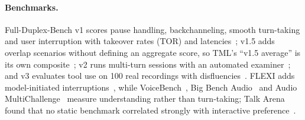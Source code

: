 \paragraph{Benchmarks.}
Full-Duplex-Bench v1 scores pause handling, backchanneling, smooth turn-taking and user interruption with takeover rates
(TOR) and latencies~\citep{lin2025fdbv1}; v1.5 adds overlap scenarios without defining an aggregate score, so TML's
``v1.5 average'' is its own composite~\citep{lin2025fdbv15}; v2 runs multi-turn sessions with an automated
examiner~\citep{lin2026fdbv2}; and v3 evaluates tool use on 100 real recordings with disfluencies~\citep{lin2026fdbv3}.
FLEXI adds model-initiated interruptions~\citep{ge2025flexi}, while VoiceBench~\citep{chen2024voicebench}, Big Bench
Audio~\citep{aa_bigbenchaudio} and Audio MultiChallenge~\citep{gosai2025audiomc} measure understanding rather than
turn-taking; Talk Arena found that no static benchmark correlated strongly with interactive preference~\citep{li2025mindthegap}.
